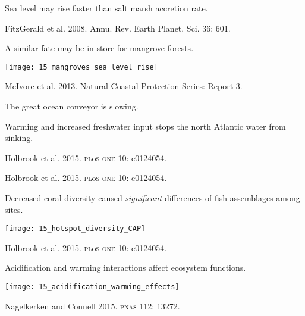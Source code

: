 \documentclass[t]{beamer}
\begin{document}
%
{
\begin{frame}[b]{Sea level may rise faster than salt marsh accretion rate.}

	\hfill \tiny FitzGerald et al. 2008. Annu. Rev. Earth Planet. Sci. 36: 601.
\end{frame}
}
%
\begin{frame}[t]{A similar fate may be in store for mangrove forests.}

	\texttt{[image: 15\_mangroves\_sea\_level\_rise]}

	\vfilll
	
	\hfill \tiny McIvore et al. 2013. Natural Coastal Protection Series: Report 3.
\end{frame}
%
{
\begin{frame}[t]{\hfill The great ocean conveyor is slowing.}

	\vspace*{11\baselineskip}
	
	\hangpara \parbox{45mm}{\raggedright Warming and increased freshwater input stops the north Atlantic water from sinking.}

\end{frame}
}
%
{
\begin{frame}[b]

	\hfill \tiny Holbrook et al. 2015. \textsc{pl}o\textsc{s one} 10: e0124054.

\end{frame}
}
%
{
\begin{frame}[b]

	\hfill \tiny Holbrook et al. 2015. \textsc{pl}o\textsc{s one} 10: e0124054.

\end{frame}
}
%
\begin{frame}[t]{Decreased coral diversity caused \emph{significant} differences of fish assemblages among sites.}

	\texttt{[image: 15\_hotspot\_diversity\_CAP]}
	
	\vfilll
	
	\hfill \tiny Holbrook et al. 2015. \textsc{pl}o\textsc{s one} 10: e0124054.

\end{frame}
%
\begin{frame}[t]{Acidification and warming interactions affect ecosystem functions.}

	\texttt{[image: 15\_acidification\_warming\_effects]}
	
	\vfilll
	
	\hfill \tiny Nagelkerken and Connell 2015. \textsc{pnas} 112: 13272.

\end{frame}
%
\end{document}
